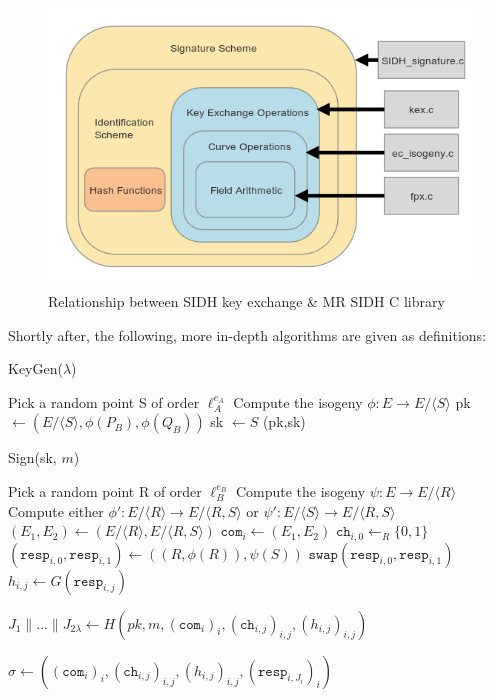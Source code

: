 \begin{figure}[htb]
\centering
\includegraphics[scale=0.7]{fullmapwcurve.png} %
\caption{Relationship between SIDH key exchange \& MR SIDH C library}
\label{fig:halfmap} %
\end{figure}


Shortly after, the following, more in-depth algorithms are given as definitions: 

\begin{algorithm}
\caption{KeyGen($\lambda$)}\label{euclid}
\begin{algorithmic}[1]
\State Pick a random point S of order $\ell^{e_{A}}_{A}$
\State Compute the isogeny $\phi: E \rightarrow E/\langle S \rangle$
\State pk $\gets (E/\langle S \rangle, \phi(P_{B}), \phi(Q_{B}))$
\State sk $\gets S$
\State \Return (pk,sk)
\end{algorithmic}
\end{algorithm}

\begin{algorithm}
\caption{Sign(sk, $m$)}\label{euclid}
\begin{algorithmic}[1]
	\State Pick a random point R of order $\ell^{e_{B}}_{B}$
	\State Compute the isogeny $\psi: E \rightarrow E/\langle R \rangle$
	\State Compute either $\phi' : E/\langle R \rangle \rightarrow E/\langle R,S \rangle$ or $\psi' : E/\langle S \rangle \rightarrow E/\langle R,S \rangle$
	\State $(E_{1},E_{2}) \gets (E/\langle R \rangle, E/\langle R,S \rangle)$
	\State $\texttt{com}_{i} \gets (E_{1}, E_{2})$
	\State $\texttt{ch}_{i,0} \gets_{R} \{0,1\}$
	\State $(\texttt{resp}_{i,0}, \texttt{resp}_{i,1}) \gets ((R,\phi(R)), \psi(S))$
		\State $\texttt{swap}(\texttt{resp}_{i,0},\texttt{resp}_{i,1})$
	\EndIf
	\State $h_{i,j} \gets G(\texttt{resp}_{i,j})$
\EndFor

\State $J_{1} \parallel ... \parallel J_{2\lambda} \gets H(pk, m, (\texttt{com}_{i})_{i},(\texttt{ch}_{i,j})_{i,j},(h_{i,j})_{i,j})$

\State \Return $\sigma \gets ((\texttt{com}_{i})_{i}, (\texttt{ch}_{i,j})_{i,j}, (h_{i,j})_{i,j}, (\texttt{resp}_{i,J_{i}})_{i})$
\end{algorithmic}
\end{algorithm}

